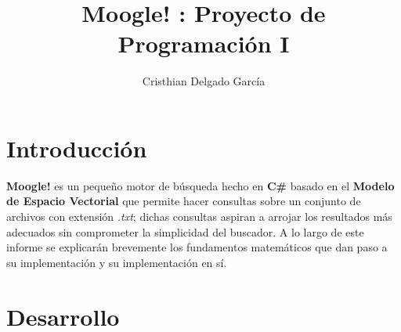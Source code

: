 \documentclass{article}
\title{\textbf{Moogle!} : Proyecto de Programación I}
\author{Cristhian Delgado García}
\date{}
\begin{document}
\newcommand{\class}[1]{\textcolor{cyan_opaco}{\texttt{#1}}}
\newcommand{\keyword}[1]{\textcolor{blue_opaco}{\texttt{#1}}}
\maketitle
\section{Introducción} \textbf{Moogle!} es un pequeño motor de búsqueda hecho en \textbf{C\#} basado en el \textbf{\mbox{Modelo} de Espacio Vectorial} que permite hacer consultas sobre un conjunto de archivos con extensión \textit{.txt}; dichas consultas aspiran a arrojar los resultados más adecuados sin comprometer la simplicidad del buscador. A lo largo de este informe se explicarán brevemente los fundamentos matemáticos que dan paso a su implementación y su implementación en sí.
\section{Desarrollo}
\end{document}
